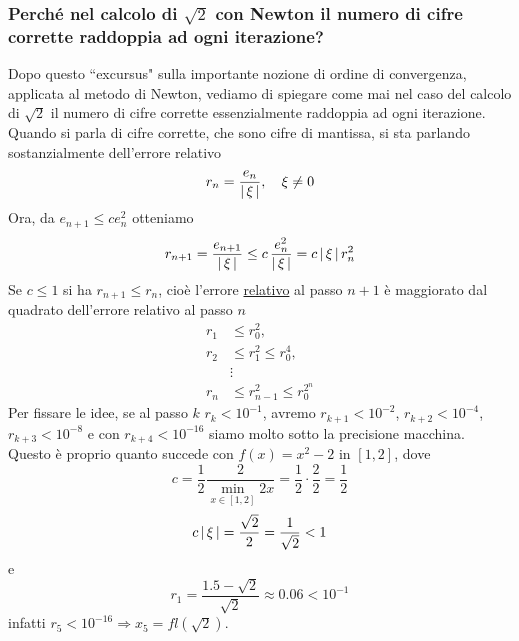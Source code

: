 \subsubsection{Perché nel calcolo di $\sqrt2$ con Newton il numero di cifre corrette raddoppia ad ogni iterazione?}
Dopo questo ``excursus" sulla importante nozione di ordine di convergenza, applicata al metodo di Newton, vediamo di spiegare come mai nel caso del calcolo di $\sqrt{2}$ il numero di cifre corrette essenzialmente raddoppia ad ogni iterazione.\\
Quando si parla di cifre corrette, che sono cifre di mantissa, si sta parlando sostanzialmente dell'errore relativo 
\[r_n = \frac{e_n}{\lvert\,\xi\,\rvert}, \quad \xi \neq 0\]
Ora, da $e_{n+1} \leq ce_n^2$ otteniamo 
\[ r_{n+1} = \frac{e_{n+1}}{\lvert\,\xi\,\rvert} \leq c\,\frac{e_n^2}{\lvert\,\xi\,\rvert} = c\,\lvert\,\xi\,\rvert\,r_n^2 \]
Se $c \leq 1$ si ha $r_{n+1} \leq r_n$, cioè l'errore \uline{relativo} al passo $n+1$ è maggiorato dal quadrato dell'errore relativo al passo $n$
\[\begin{split}
    r_1 & \leq r_0^2,\\
    r_2 & \leq r_1^2 \leq r_0^4,\\ 
    & \vdots \\ 
    r_n & \leq r_{n-1}^2 \leq r_0^{2^n}
\end{split}\]
Per fissare le idee, se al passo $k$ $r_k < 10^{-1}$, avremo $r_{k+1} < 10^{-2}$, $r_{k+2} < 10^{-4}$, $r_{k+3} < 10^{-8}$ e con $r_{k+4} < 10^{-16}$ siamo molto sotto la precisione macchina. \\
Questo è proprio quanto succede con $f(x) = x^2 - 2$ in $[1,2]$, dove 
\[ c = \frac{1}{2}\frac{2}{\underset{x \in [1,2]}{\min}2x}  = \frac{1}{2} \cdot \frac{2}{2} = \frac{1}{2} \]
\[c\,\lvert\,\xi\,\rvert = \frac{\sqrt{2}}{2} = \frac{1}{\sqrt{2}} < 1\]
e
\[ r_1 = \frac{1.5 - \sqrt{2}}{\sqrt{2}} \approx 0.06 < 10^{-1} \]
infatti $r_5 < 10^{-16} \Rightarrow x_5 = fl(\sqrt{2})$.

